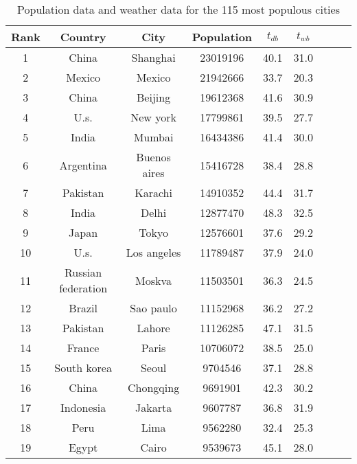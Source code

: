 \begin{table}
\centering
\caption{Population data and weather data for the 115 most populous cities}
\label{tab:pop_weather}
\begin{tabular}{ccccccccc}
\toprule
Rank &             Country &            City & Population & $t_{db}$ & $t_{wb}$ \\
\midrule
   1 &               China &        Shanghai &   23019196 &     40.1 &     31.0 \\
   2 &              Mexico &          Mexico &   21942666 &     33.7 &     20.3 \\
   3 &               China &         Beijing &   19612368 &     41.6 &     30.9 \\
   4 &                U.s. &        New york &   17799861 &     39.5 &     27.7 \\
   5 &               India &          Mumbai &   16434386 &     41.4 &     30.0 \\
   6 &           Argentina &    Buenos aires &   15416728 &     38.4 &     28.8 \\
   7 &            Pakistan &         Karachi &   14910352 &     44.4 &     31.7 \\
   8 &               India &           Delhi &   12877470 &     48.3 &     32.5 \\
   9 &               Japan &           Tokyo &   12576601 &     37.6 &     29.2 \\
  10 &                U.s. &     Los angeles &   11789487 &     37.9 &     24.0 \\
  11 &  Russian federation &          Moskva &   11503501 &     36.3 &     24.5 \\
  12 &              Brazil &       Sao paulo &   11152968 &     36.2 &     27.2 \\
  13 &            Pakistan &          Lahore &   11126285 &     47.1 &     31.5 \\
  14 &              France &           Paris &   10706072 &     38.5 &     25.0 \\
  15 &         South korea &           Seoul &    9704546 &     37.1 &     28.8 \\
  16 &               China &       Chongqing &    9691901 &     42.3 &     30.2 \\
  17 &           Indonesia &         Jakarta &    9607787 &     36.8 &     31.9 \\
  18 &                Peru &            Lima &    9562280 &     32.4 &     25.3 \\
  19 &               Egypt &           Cairo &    9539673 &     45.1 &     28.0 \\

\end{tabular}
\end{table}
